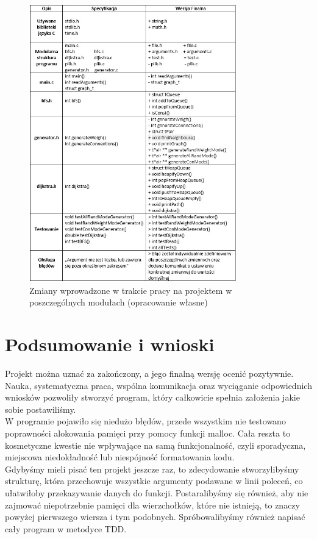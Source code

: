 \documentclass{article}
\begin{document}
 \begin{figure}[h]
\centering
\includegraphics[width=0.8\textwidth]{zmiany.jpg}
\caption{\label{fig:mod}Zmiany wprowadzone w trakcie pracy na projektem w poszczególnych modułach (opracowanie własne)}
\end{figure}




\section{Podsumowanie i wnioski}
 Projekt można uznać za zakończony, a jego finalną wersję ocenić pozytywnie. Nauka, systematyczna praca, wspólna komunikacja oraz wyciąganie odpowiednich wniosków pozwoliły stworzyć program, który całkowicie spełnia założenia jakie sobie postawiliśmy. \\ 
W programie pojawiło się niedużo błędów, przede wszystkim nie testowano poprawności alokowania pamięci przy pomocy funkcji malloc. Cała reszta to kosmetyczne kwestie nie wpływające na samą funkcjonalność, czyli sporadyczna, miejscowa niedokładność lub niespójność formatowania kodu. \\ 
Gdybyśmy mieli pisać ten projekt jeszcze raz, to zdecydowanie stworzylibyśmy strukturę, która przechowuje wszystkie argumenty podawane w linii poleceń, co ułatwiłoby przekazywanie danych do funkcji. Postaralibyśmy się również, aby nie zajmować niepotrzebnie pamięci dla wierzchołków, które nie istnieją, to znaczy powyżej pierwszego wiersza i tym podobnych. Spróbowalibyśmy również napisać cały program w metodyce TDD.  
\end{document}

